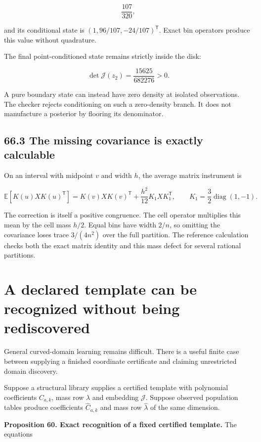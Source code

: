 \[
\boxed{\frac{107}{320},}
\]

and its conditional state is \((1,96/107,-24/107)^{\mathsf T}\). Exact
bin operators produce this value without quadrature.

The final point-conditioned state remains strictly inside the disk:

\[
\det\mathcal J(z_2)=\frac{15625}{682276}>0.
\]

A pure boundary state can instead have zero density at isolated
observations. The checker rejects conditioning on such a zero-density
branch. It does not manufacture a posterior by flooring its denominator.

\subsection{66.3 The missing covariance is exactly
calculable}\label{LSM:the-missing-covariance-is-exactly-calculable}

On an interval with midpoint \(v\) and width \(h\), the average matrix
instrument is

\[
\mathbb E[K(u)XK(u)^{\mathsf T}]
=K(v)XK(v)^{\mathsf T}
+\frac{h^2}{12}K_1XK_1^{\mathsf T},
\qquad K_1=\frac32\operatorname{diag}(1,-1).
\]

The correction is itself a positive congruence. The cell operator
multiplies this mean by the cell mass \(h/2\). Equal bins have width
\(2/n\), so omitting the covariance loses trace \(3/(4n^2)\) over the
full partition. The reference calculation checks both the exact matrix
identity and this mass defect for several rational partitions.

\section{A declared template can be recognized without being rediscovered}\label{LSM:a-declared-template-can-be-recognized-without-being-rediscovered}

General curved-domain learning remains difficult. There is a useful
finite case between supplying a finished coordinate certificate and
claiming unrestricted domain discovery.

Suppose a structural library supplies a certified template with
polynomial coefficients \(C_{a,k}\), mass row \(\lambda\) and embedding
\(\mathcal J\). Suppose observed population tables produce coefficients
\(\widehat C_{a,k}\) and mass row \(\widehat\lambda\) of the same
dimension.

\textbf{Proposition 60. Exact recognition of a fixed certified
template.} The equations

